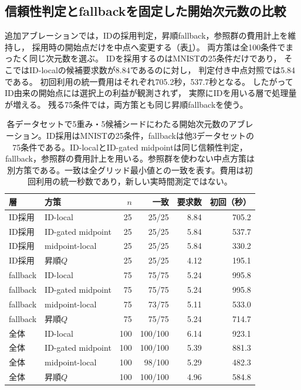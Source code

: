 \documentclass[11pt,a4paper]{ltjsarticle}
\begin{document}
\subsection{信頼性判定とfallbackを固定した開始次元数の比較}\label{sec:gated}
追加アブレーションでは，IDの採用判定，昇順fallback，参照群の費用計上を維持し，
採用時の開始点だけを中点へ変更する（表\ref{tab:gated}）。
両方策は全100条件でまったく同じ次元数を選ぶ。
IDを採用するのはMNISTの25条件だけであり，
そこではID-localの候補要求数が8.84であるのに対し，
判定付き中点対照では5.84である。
初回利用の統一費用はそれぞれ705.2秒，537.7秒となる。
したがってID由来の開始点には選択上の利益が観測されず，
実際にIDを用いる層で処理量が増える。
残る75条件では，両方策とも同じ昇順fallbackを使う。
\begin{table}[H]
\caption{各データセットで5重み・5候補シードにわたる開始次元数のアブレーション。ID採用はMNISTの25条件，fallbackは他3データセットの75条件である。ID-localとID-gated midpointは同じ信頼性判定，fallback，参照群の費用計上を用いる。参照群を使わない中点方策は別方策である。一致は全グリッド最小値との一致を表す。費用は初回利用の統一秒数であり，新しい実時間測定ではない。}\label{tab:gated}
\small
\setlength{\tabcolsep}{3pt}
\begin{tabular*}{\textwidth}{@{\extracolsep{\fill}}llrrrr@{}}
\toprule
層 & 方策 & $n$ & 一致 & 要求数 & 初回（秒） \\
\midrule
ID採用 & ID-local & 25 & 25/25 & 8.84 & 705.2 \\
ID採用 & ID-gated midpoint & 25 & 25/25 & 5.84 & 537.7 \\
ID採用 & midpoint-local & 25 & 25/25 & 5.84 & 330.2 \\
ID採用 & 昇順$Q$ & 25 & 25/25 & 4.12 & 195.1 \\
fallback & ID-local & 75 & 75/75 & 5.24 & 995.8 \\
fallback & ID-gated midpoint & 75 & 75/75 & 5.24 & 995.8 \\
fallback & midpoint-local & 75 & 73/75 & 5.11 & 533.0 \\
fallback & 昇順$Q$ & 75 & 75/75 & 5.24 & 714.7 \\
全体 & ID-local & 100 & 100/100 & 6.14 & 923.1 \\
全体 & ID-gated midpoint & 100 & 100/100 & 5.39 & 881.3 \\
全体 & midpoint-local & 100 & 98/100 & 5.29 & 482.3 \\
全体 & 昇順$Q$ & 100 & 100/100 & 4.96 & 584.8 \\
\bottomrule\end{tabular*}
\end{table}
\end{document}
